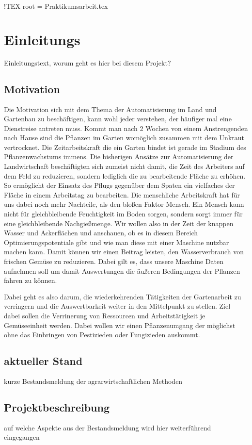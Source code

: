 !TEX root = Praktikumsarbeit.tex  %

\section{Einleitungs}
Einleitungstext, worum geht es hier bei diesem Projekt?

\subsection{Motivation} 


Die Motivation sich mit dem Thema der Automatisierung im Land und Gartenbau zu beschäftigen, kann wohl jeder verstehen, der häufiger mal eine Dienstreise antreten muss. Kommt man nach 2 Wochen von einem Anstrengenden nach Hause sind die Pflanzen im Garten womöglich zusammen mit dem Unkraut vertrocknet. Die Zeitarbeitskraft die ein Garten bindet ist gerade im Stadium des Pflanzenwachstums immens.
\newline
Die bisherigen Ansätze zur Automatisierung der Landwirtschaft beschäftigten sich zumeist nicht damit, die Zeit des Arbeiters auf dem Feld zu reduzieren, sondern lediglich die zu bearbeitende Fläche zu erhöhen. So ermöglicht der Einsatz des Pflugs gegenüber dem Spaten ein vielfaches der Fläche in einem Arbeitstag zu bearbeiten. 
\newline 
Die menschliche Arbeitskraft hat für uns dabei noch mehr Nachteile, als den bloßen Faktor Mensch. Ein Mensch kann nicht für gleichbleibende Feuchtigkeit im Boden sorgen, sondern sorgt immer für eine gleichbleibende Nachgießmenge. Wir wollen also in der Zeit der knappen Wasser und Ackerflächen und anschauen, ob es in diesem Bereich Optimierungspotentiale gibt und wie man diese mit einer Maschine nutzbar machen kann. Damit können wir einen Beitrag leisten, den Wasserverbrauch von frischen Gemüse zu reduzieren. Dabei gilt es, dass unsere Maschine Daten aufnehmen soll um damit Auswertungen die äußeren Bedingungen der Pflanzen fahren zu können. 

Dabei geht es also darum, die wiederkehrenden Tätigkeiten der Gartenarbeit zu verringern und die Auswertbarkeit weiter in den Mittelpunkt zu stellen. Ziel dabei sollen die Verrinerung von Ressourcen und Arbeitstätigkeit je Gemüseeinheit werden.
\newline
Dabei wollen wir einen Pflanzenumgang der möglichst ohne das Einbringen von Pestizieden oder Fungizieden auskommt.

\subsection{aktueller Stand}
kurze Bestandsmeldung der agrarwirtschaftlichen Methoden

\subsection{Projektbeschreibung}
auf welche Aspekte aus der Bestandsmeldung wird hier weiterführend eingegangen
